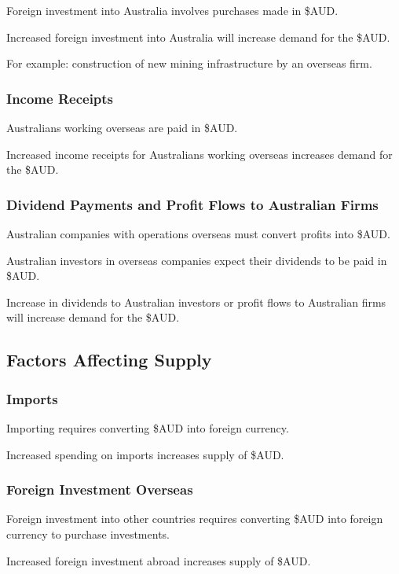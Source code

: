 \documentclass[a4paper,11pt]{report}
\begin{document}
Foreign investment into Australia involves purchases made in \$AUD.

Increased foreign investment into Australia will increase demand for the \$AUD.

For example: construction of new mining infrastructure by an overseas firm.

\subsubsection{Income Receipts}

Australians working overseas are paid in \$AUD.

Increased income receipts for Australians working overseas increases demand for
the \$AUD.

\subsubsection{Dividend Payments and Profit Flows to Australian Firms}

Australian companies with operations overseas must convert profits into \$AUD.

Australian investors in overseas companies expect their dividends to be paid
in \$AUD.

Increase in dividends to Australian investors or profit flows to Australian
firms will increase demand for the \$AUD.

\subsection{Factors Affecting Supply}

\subsubsection{Imports}

Importing requires converting \$AUD into foreign currency.

Increased spending on imports increases supply of \$AUD.

\subsubsection{Foreign Investment Overseas}

Foreign investment into other countries requires converting \$AUD into foreign
currency to purchase investments.

Increased foreign investment abroad increases supply of \$AUD.
\end{document}
